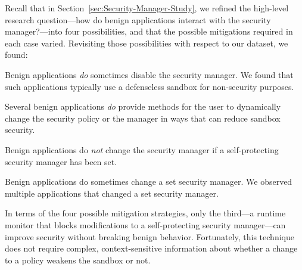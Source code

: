 \documentclass{sig-alternate}
\begin{document}
Recall that in Section~\ref{sec:Security-Manager-Study}, we refined the
high-level research question---how do benign applications interact with the
security manager?---into four possibilities, and that the possible mitigations
required in each case varied.  Revisiting those
possibilities with respect to our dataset, we found:
\begin{flushenum}\setlength{\parskip}{0pt}
  \setlength{\parsep}{0pt}
  \setlength{\itemsep}{0pt}
\item Benign applications \emph{do} sometimes disable the security manager.
  We found that such applications typically use a defenseless sandbox for
  non-security purposes.

\item Several benign applications \emph{do} provide methods for the user to
  dynamically change the security policy or the manager in ways that can reduce
  sandbox security.

\item Benign applications do \emph{not} change the
security manager if a self-protecting security manager has been set.  

\item Benign applications do sometimes change a set security manager.  We
  observed multiple applications that changed a set security manager.
\end{flushenum}

In terms of the four possible mitigation strategies,
only the third---a runtime monitor that blocks modifications to a self-protecting security manager---can
improve security without breaking benign behavior. 
Fortunately, this technique does not require complex, context-sensitive
information about whether a change to a policy weakens the sandbox or not. 
\end{document}

